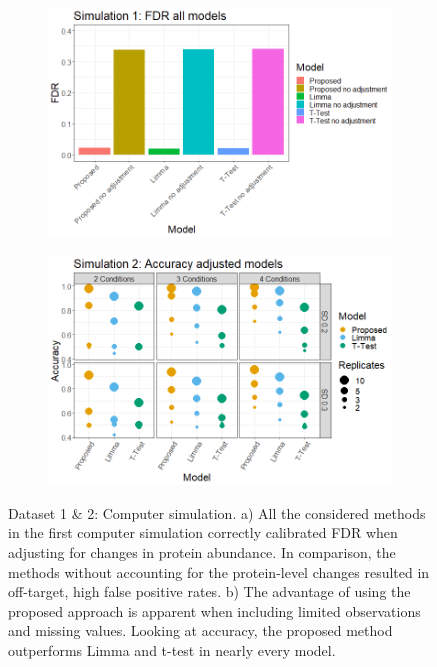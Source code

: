 \documentclass[mcp]{article}
\numberwithin{table}{section}
\begin{document}
\begin{figure}[ht]
\centering
\begin{subfigure}[c]{0.825\linewidth}
\includegraphics[width=1\textwidth]{images/sim1_FDR_all_models.png}
\caption{}
\label{fig:sim1_fdr}
\end{subfigure}
\begin{subfigure}[c]{0.825\linewidth}
\includegraphics[width=1\textwidth]{images/sim3_Accuracy.png}
\caption{}
\label{fig:sim2_acc}
\end{subfigure}
\caption{Dataset 1 \& 2: Computer simulation. a) All the considered methods in the first computer simulation correctly calibrated FDR when adjusting for changes in protein abundance. In comparison, the methods without accounting for the protein-level changes resulted in off-target, high false positive rates. b) The advantage of using the proposed approach is apparent when including limited observations and missing values. Looking at accuracy, the proposed method outperforms Limma and t-test in nearly every model.
}
\label{fig:computer_sim}
\end{figure}
\end{document}
